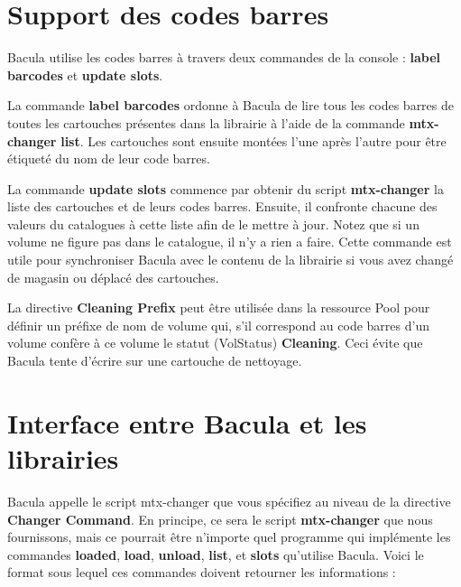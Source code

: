 \label{Barcodes}

\section{Support des codes barres}

Bacula utilise les codes barres \`a travers deux commandes de la console : 
{\bf label barcodes} et {\bf update slots}.

La commande  {\bf label barcodes} ordonne \`a Bacula de lire tous les codes 
barres de toutes les cartouches pr\'esentes dans la librairie \`a l'aide de la 
commande {\bf mtx-changer} {\bf list}. Les cartouches sont ensuite mont\'ees 
l'une apr\`es l'autre pour \^etre \'etiquet\'e du nom de leur code barres.

La commande {\bf update slots} commence par obtenir du script {\bf mtx-changer}
la liste des cartouches et de leurs codes barres. Ensuite, il confronte 
chacune des valeurs du catalogues \`a cette liste afin de le mettre \`a jour. 
Notez que si un volume ne figure pas dans le catalogue, il n'y a rien a faire. 
Cette commande est utile pour synchroniser Bacula avec le contenu de la librairie 
si vous avez chang\'e de magasin ou d\'eplac\'e des cartouches.

La directive {\bf Cleaning Prefix} peut \^etre utilis\'ee dans la ressource Pool pour 
d\'efinir un pr\'efixe de nom de volume qui, s'il correspond au code barres d'un volume 
conf\`ere \`a ce volume le statut (VolStatus) {\bf Cleaning}. Ceci \'evite que Bacula 
tente d'\'ecrire sur une cartouche de nettoyage.

\label{interface}

\section{Interface entre Bacula et les librairies}

Bacula appelle le script mtx-changer que vous sp\'ecifiez au niveau de la 
directive {\bf Changer Command}. En principe, ce sera le script {\bf mtx-changer} 
que nous fournissons, mais ce pourrait \^etre n'importe quel programme 
qui impl\'emente les commandes {\bf loaded}, {\bf load}, {\bf unload}, {\bf list}, 
et {\bf slots} qu'utilise Bacula. Voici le format sous lequel ces commandes 
doivent retourner les informations :

